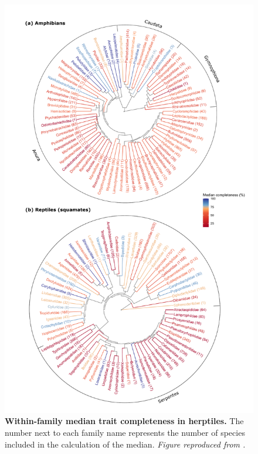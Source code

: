 \begin{figure}[h!]
\centering
\includegraphics[scale=0.51]{figures/Chapter2/Figure_3}
\caption[Within-family median trait completeness in herptiles]{\textbf{Within-family median trait completeness in herptiles.} The number next to each family name represents the number of species included in the calculation of the median. \textit{Figure reproduced from \citet{Etard2020}.}}
\label{1_Phylo}
\end{figure}

\clearpage


